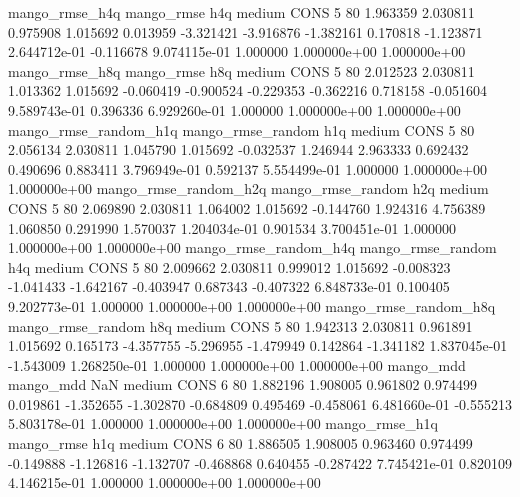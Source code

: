        mango_rmse_h4q        mango_rmse                  h4q     medium     CONS                 5 80  1.963359       2.030811 0.975908       1.015692    0.013959     -3.321421     -3.916876    -1.382161       0.170818 -1.123871 2.644712e-01    -0.116678   9.074115e-01            1.000000    1.000000e+00        1.000000e+00
       mango_rmse_h8q        mango_rmse                  h8q     medium     CONS                 5 80  2.012523       2.030811 1.013362       1.015692   -0.060419     -0.900524     -0.229353    -0.362216       0.718158 -0.051604 9.589743e-01     0.396336   6.929260e-01            1.000000    1.000000e+00        1.000000e+00
mango_rmse_random_h1q mango_rmse_random                  h1q     medium     CONS                 5 80  2.056134       2.030811 1.045790       1.015692   -0.032537      1.246944      2.963333     0.692432       0.490696  0.883411 3.796949e-01     0.592137   5.554499e-01            1.000000    1.000000e+00        1.000000e+00
mango_rmse_random_h2q mango_rmse_random                  h2q     medium     CONS                 5 80  2.069890       2.030811 1.064002       1.015692   -0.144760      1.924316      4.756389     1.060850       0.291990  1.570037 1.204034e-01     0.901534   3.700451e-01            1.000000    1.000000e+00        1.000000e+00
mango_rmse_random_h4q mango_rmse_random                  h4q     medium     CONS                 5 80  2.009662       2.030811 0.999012       1.015692   -0.008323     -1.041433     -1.642167    -0.403947       0.687343 -0.407322 6.848733e-01     0.100405   9.202773e-01            1.000000    1.000000e+00        1.000000e+00
mango_rmse_random_h8q mango_rmse_random                  h8q     medium     CONS                 5 80  1.942313       2.030811 0.961891       1.015692    0.165173     -4.357755     -5.296955    -1.479949       0.142864 -1.341182 1.837045e-01    -1.543009   1.268250e-01            1.000000    1.000000e+00        1.000000e+00
            mango_mdd         mango_mdd                  NaN     medium     CONS                 6 80  1.882196       1.908005 0.961802       0.974499    0.019861     -1.352655     -1.302870    -0.684809       0.495469 -0.458061 6.481660e-01    -0.555213   5.803178e-01            1.000000    1.000000e+00        1.000000e+00
       mango_rmse_h1q        mango_rmse                  h1q     medium     CONS                 6 80  1.886505       1.908005 0.963460       0.974499   -0.149888     -1.126816     -1.132707    -0.468868       0.640455 -0.287422 7.745421e-01     0.820109   4.146215e-01            1.000000    1.000000e+00        1.000000e+00
